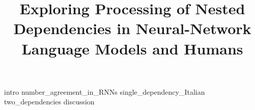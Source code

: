 \documentclass[a4paper,man,natbib, floatsintext, hidelinks]{apa7}
\title{Exploring Processing of Nested Dependencies in Neural-Network Language Models and Humans}
\begin{document}
\maketitle


{intro}
{number_agreement_in_RNNs}
{single_dependency_Italian}
{two_dependencies}
{discussion}




\end{document}
